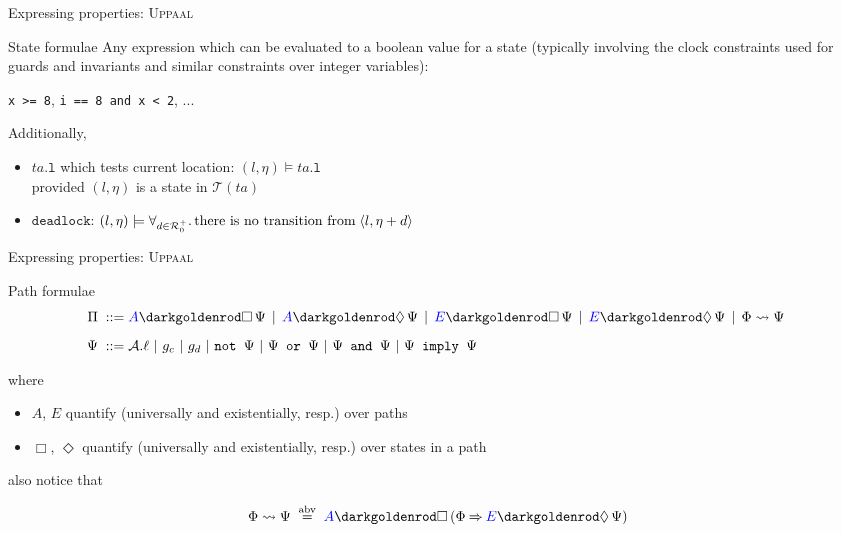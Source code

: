 \documentclass{beamer}
\def\dgold#1{{\darkgoldenrod #1}}
\def\dkb#1{{\blue #1}}
\def\R{\mathcal{R}}
\def\TL#1{\mathcal{T}(#1)}
\begin{document}
\begin{slide}{Expressing properties: \textsc{Uppaal}}
\small

\begin{block}{State formulae}
Any expression which can be evaluated to a boolean value for a state (typically involving the 
\dgold{clock constraints} used for guards and invariants and similar constraints over integer variables):
\begin{center}
\texttt{x >= 8}, \texttt{i == 8 and x < 2}, ...
\end{center}
Additionally,
\begin{itemize}
\item $ta.\texttt{l}$ which tests \dgold{current location}:  $(l, \eta) \models ta.\texttt{l}$ \\
provided $(l, \eta)$ is a state in $\TL{ta}$
\item $\texttt{deadlock}$: $(l, \eta) \models \forall_{d \in \R_0^+} .\, \text{there is no transition from} \; \pair{l,\eta+d}$ 
\end{itemize}
\end{block}

\end{slide}

\begin{slide}{Expressing properties: \textsc{Uppaal}}
\small

\newcommand{\Boxc}{\dgold{\Box}}
\newcommand{\Diamondc}{\dgold{\Diamond}}
\newcommand{\Ac}{\dkb{A}}
\newcommand{\Ec}{\dkb{E}}

\begin{block}{Path formulae}
\begin{align*}
\Pi\; ::=\; & \Ac \Boxc\, \Psi\, \mid\, \Ac\Diamondc\, \Psi\, \mid\, \Ec \Boxc\, \Psi\, \mid\, \Ec \Diamondc\, \Psi\, \mid\, \Phi \leadsto  \Psi\
\\[2mm]
\Psi\; ::=\; & \mathcal{A}.\ell ~|~ g_c ~|~ g_d ~|~ \texttt{not~}\Psi ~|~ \Psi \texttt{ or }\Psi ~|~ \Psi \texttt{ and }\Psi ~|~ \Psi \texttt{ imply }\Psi
\end{align*}

where
\begin{itemize}
\item \dkb{$A$, $E$} quantify (universally and existentially, resp.) over \dkb{paths}
\item \dgold{$\Box$, $\Diamond$} quantify (universally and existentially, resp.) over \dgold{states in a path}
\end{itemize}
also notice that

\begin{align*}
 \Phi \leadsto  \Psi\; \abv\; \Ac \Boxc\, (\Phi \imp \Ec \Diamondc\, \Psi)
\end{align*}
\end{block}

\end{slide}
\end{document}
